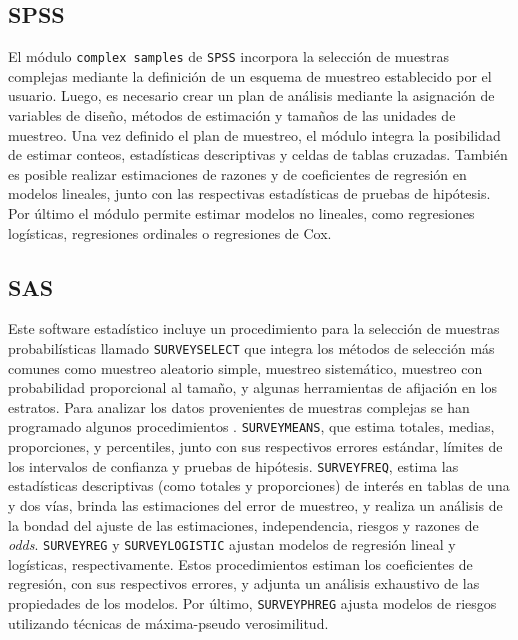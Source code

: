 \documentclass[
  10pt,
  spanish,
]{book}
\begin{document}
\hypertarget{spss}{%
\subsection*{SPSS}\label{spss}}

El módulo \texttt{complex\ samples} de \texttt{SPSS} \citep{IBM_2017} incorpora la selección de muestras complejas mediante la definición de un esquema de muestreo establecido por el usuario. Luego, es necesario crear un plan de análisis mediante la asignación de variables de diseño, métodos de estimación y tamaños de las unidades de muestreo. Una vez definido el plan de muestreo, el módulo integra la posibilidad de estimar conteos, estadísticas descriptivas y celdas de tablas cruzadas. También es posible realizar estimaciones de razones y de coeficientes de regresión en modelos lineales, junto con las respectivas estadísticas de pruebas de hipótesis. Por último el módulo permite estimar modelos no lineales, como regresiones logísticas, regresiones ordinales o regresiones de Cox.

\hypertarget{sas}{%
\subsection*{SAS}\label{sas}}

Este software estadístico incluye un procedimiento para la selección de muestras probabilísticas llamado \texttt{SURVEYSELECT} que integra los métodos de selección más comunes como muestreo aleatorio simple, muestreo sistemático, muestreo con probabilidad proporcional al tamaño, y algunas herramientas de afijación en los estratos. Para analizar los datos provenientes de muestras complejas se han programado algunos procedimientos \citep{SAS_2017}. \texttt{SURVEYMEANS}, que estima totales, medias, proporciones, y percentiles, junto con sus respectivos errores estándar, límites de los intervalos de confianza y pruebas de hipótesis. \texttt{SURVEYFREQ}, estima las estadísticas descriptivas (como totales y proporciones) de interés en tablas de una y dos vías, brinda las estimaciones del error de muestreo, y realiza un análisis de la bondad del ajuste de las estimaciones, independencia, riesgos y razones de \emph{odds}. \texttt{SURVEYREG} y \texttt{SURVEYLOGISTIC} ajustan modelos de regresión lineal y logísticas, respectivamente. Estos procedimientos estiman los coeficientes de regresión, con sus respectivos errores, y adjunta un análisis exhaustivo de las propiedades de los modelos. Por último, \texttt{SURVEYPHREG} ajusta modelos de riesgos utilizando técnicas de máxima-pseudo verosimilitud.
\end{document}
